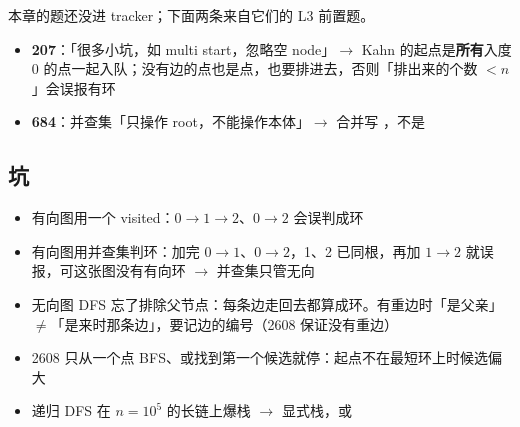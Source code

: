 \begin{mynote}
本章的题还没进 tracker；下面两条来自它们的 L3 前置题。
\begin{itemize}
\item \textbf{207}：「很多小坑，如 multi start，忽略空 node」$\to$ Kahn 的起点是\textbf{所有}入度 0 的点一起入队；没有边的点也是点，也要排进去，否则「排出来的个数 $< n$」会误报有环
\item \textbf{684}：并查集「只操作 root，不能操作本体」$\to$ 合并写 ，不是 
\end{itemize}
\end{mynote}

\subsection{坑}
\begin{itemize}
\item 有向图用一个 visited：$0 \to 1 \to 2$、$0 \to 2$ 会误判成环
\item 有向图用并查集判环：加完 $0 \to 1$、$0 \to 2$，1、2 已同根，再加 $1 \to 2$ 就误报，可这张图没有有向环 $\to$ 并查集只管无向
\item 无向图 DFS 忘了排除父节点：每条边走回去都算成环。有重边时「是父亲」$\ne$「是来时那条边」，要记边的编号（2608 保证没有重边）
\item 2608 只从一个点 BFS、或找到第一个候选就停：起点不在最短环上时候选偏大
\item 递归 DFS 在 $n = 10^5$ 的长链上爆栈 $\to$ 显式栈，或 
\end{itemize}
